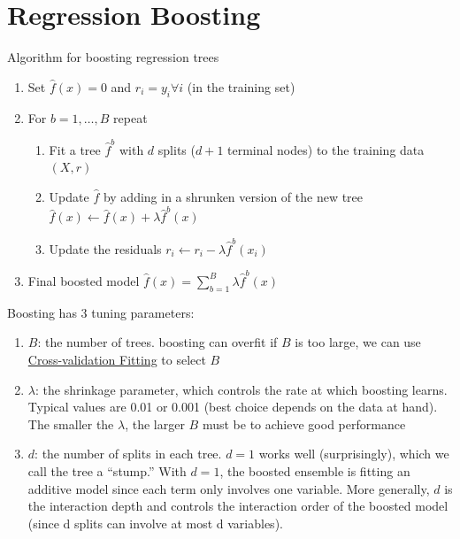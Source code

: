 \documentclass[
]{book}
\providecommand{\tightlist}{%
  \setlength{\itemsep}{0pt}\setlength{\parskip}{0pt}}
\begin{document}
\hypertarget{regression-boosting}{%
\section{Regression Boosting}\label{regression-boosting}}

Algorithm for boosting regression trees

\begin{enumerate}
\def\labelenumi{\arabic{enumi}.}
\item
  Set \(\hat{f}(x) = 0\) and \(r_i = y_i \forall i\) (in the training set)
\item
  For \(b = 1, \dots, B\) repeat

  \begin{enumerate}
  \def\labelenumii{\arabic{enumii}.}
  \item
    Fit a tree \(\hat{f}^b\) with \(d\) splits (\(d + 1\) terminal nodes) to the training data \((X,r)\)
  \item
    Update \(\hat{f}\) by adding in a shrunken version of the new tree \(\hat{f}(x) \leftarrow \hat{f}(x) + \lambda \hat{f}^b (x)\)
  \item
    Update the residuals \(r_i \leftarrow r_i - \lambda \hat{f}^b (x_i)\)
  \end{enumerate}
\item
  Final boosted model \(\hat{f}(x) = \sum_{b=1}^B \lambda \hat{f}^b (x)\)
\end{enumerate}

Boosting has 3 tuning parameters:

\begin{enumerate}
\def\labelenumi{\arabic{enumi}.}
\tightlist
\item
  \(B\): the number of trees. boosting can overfit if \(B\) is too large, we can use \protect\hyperlink{cross-validation-fitting}{Cross-validation Fitting} to select \(B\)
\item
  \(\lambda\): the shrinkage parameter, which controls the rate at which boosting learns. Typical values are 0.01 or 0.001 (best choice depends on the data at hand). The smaller the \(\lambda\), the larger \(B\) must be to achieve good performance
\item
  \(d\): the number of splits in each tree. \(d = 1\) works well (surprisingly), which we call the tree a ``stump.'' With \(d =1\), the boosted ensemble is fitting an additive model since each term only involves one variable. More generally, \(d\) is the interaction depth and controls the interaction order of the boosted model (since d splits can involve at most d variables).
\end{enumerate}
\end{document}
